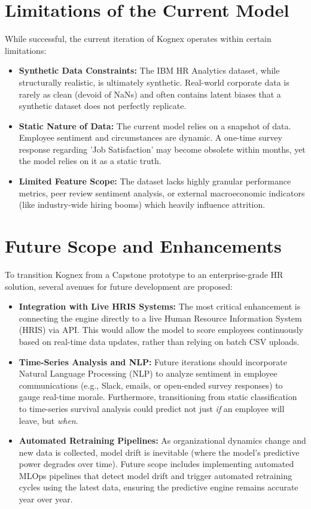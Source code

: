 \section{Limitations of the Current Model}
While successful, the current iteration of Kognex operates within certain limitations:
\begin{itemize}
    \item \textbf{Synthetic Data Constraints:} The IBM HR Analytics dataset, while structurally realistic, is ultimately synthetic. Real-world corporate data is rarely as clean (devoid of NaNs) and often contains latent biases that a synthetic dataset does not perfectly replicate.
    \item \textbf{Static Nature of Data:} The current model relies on a snapshot of data. Employee sentiment and circumstances are dynamic. A one-time survey response regarding 'Job Satisfaction' may become obsolete within months, yet the model relies on it as a static truth.
    \item \textbf{Limited Feature Scope:} The dataset lacks highly granular performance metrics, peer review sentiment analysis, or external macroeconomic indicators (like industry-wide hiring booms) which heavily influence attrition.
\end{itemize}

\section{Future Scope and Enhancements}
To transition Kognex from a Capstone prototype to an enterprise-grade HR solution, several avenues for future development are proposed:
\begin{itemize}
    \item \textbf{Integration with Live HRIS Systems:} The most critical enhancement is connecting the engine directly to a live Human Resource Information System (HRIS) via API. This would allow the model to score employees continuously based on real-time data updates, rather than relying on batch CSV uploads.
    \item \textbf{Time-Series Analysis and NLP:} Future iterations should incorporate Natural Language Processing (NLP) to analyze sentiment in employee communications (e.g., Slack, emails, or open-ended survey responses) to gauge real-time morale. Furthermore, transitioning from static classification to time-series survival analysis could predict not just \textit{if} an employee will leave, but \textit{when}.
    \item \textbf{Automated Retraining Pipelines:} As organizational dynamics change and new data is collected, model drift is inevitable (where the model's predictive power degrades over time). Future scope includes implementing automated MLOps pipelines that detect model drift and trigger automated retraining cycles using the latest data, ensuring the predictive engine remains accurate year over year.
\end{itemize}
